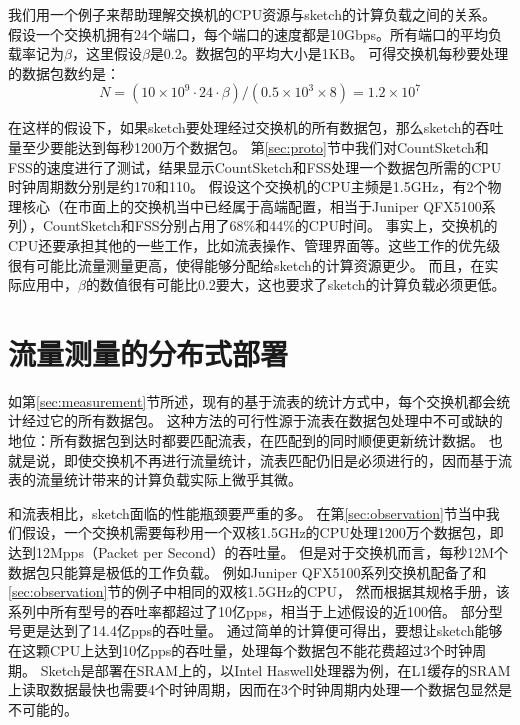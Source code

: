我们用一个例子来帮助理解交换机的CPU资源与sketch的计算负载之间的关系。
假设一个交换机拥有24个端口，每个端口的速度都是10Gbps。所有端口的平均负载率记为$\beta$，这里假设$\beta$是0.2。数据包的平均大小是1KB。
可得交换机每秒要处理的数据包数约是：
\begin{equation}%
    N = (10\times 10^9\cdot 24 \cdot \beta)/(0.5\times 10^3 \times 8) = 1.2\times 10^7
\end{equation}

在这样的假设下，如果sketch要处理经过交换机的所有数据包，那么sketch的吞吐量至少要能达到每秒1200万个数据包。
第\ref{sec:proto}节中我们对CountSketch和FSS的速度进行了测试，结果显示CountSketch和FSS处理一个数据包所需的CPU时钟周期数分别是约170和110。
假设这个交换机的CPU主频是1.5GHz，有2个物理核心（在市面上的交换机当中已经属于高端配置，相当于Juniper QFX5100系列\cite{juniper2018qfx5100}），CountSketch和FSS分别占用了68\%和44\%的CPU时间。
事实上，交换机的CPU还要承担其他的一些工作，比如流表操作、管理界面等。这些工作的优先级很有可能比流量测量更高，使得能够分配给sketch的计算资源更少。
而且，在实际应用中，$\beta$的数值很有可能比0.2要大，这也要求了sketch的计算负载必须更低。



\section{流量测量的分布式部署}

如第\ref{sec:measurement}节所述，现有的基于流表的统计方式中，每个交换机都会统计经过它的所有数据包。
这种方法的可行性源于流表在数据包处理中不可或缺的地位：所有数据包到达时都要匹配流表，在匹配到的同时顺便更新统计数据。
也就是说，即使交换机不再进行流量统计，流表匹配仍旧是必须进行的，因而基于流表的流量统计带来的计算负载实际上微乎其微。

和流表相比，sketch面临的性能瓶颈要严重的多。
在第\ref{sec:observation}节当中我们假设，一个交换机需要每秒用一个双核1.5GHz的CPU处理1200万个数据包，即达到12Mpps（Packet per Second）的吞吐量。
但是对于交换机而言，每秒12M个数据包只能算是极低的工作负载。
例如Juniper QFX5100系列交换机配备了和\ref{sec:observation}节的例子中相同的双核1.5GHz的CPU，
然而根据其规格手册，该系列中所有型号的吞吐率都超过了10亿pps\cite{juniper2018qfx5100}，相当于上述假设的近100倍。
部分型号更是达到了14.4亿pps的吞吐量。
通过简单的计算便可得出，要想让sketch能够在这颗CPU上达到10亿pps的吞吐量，处理每个数据包不能花费超过3个时钟周期。
Sketch是部署在SRAM上的，以Intel Haswell处理器为例，在L1缓存的SRAM上读取数据最快也需要4个时钟周期\cite{hammarlund20134th}，因而在3个时钟周期内处理一个数据包显然是不可能的。

